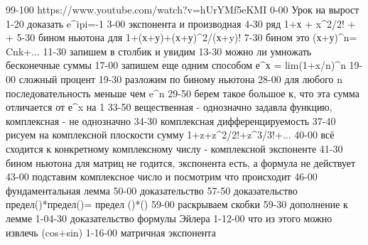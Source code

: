 99-100
https://www.youtube.com/watch?v=hUrYMf5eKMI
0-00 Урок на вырост
1-20 доказать e^ipi=-1
3-00 экспонента и производная
4-30 ряд 1+х + x^2/2! + +
5-30 бином ньютона для 1+(х+у)+(х+у)^2/(х+y)!
7-30 бином это (х+у)^n= Cnk+...
11-30 запишем в столбик и увидим
13-30 можно ли умножать бесконечные суммы
17-00 запишем еще одним способом е^х = lim(1+x/n)^n
19-00 сложный процент
19-30 разложим по биному ньютона
28-00 для любого n последовательность меньше чем e^n
29-50 берем такое большое к, что эта сумма отличается от е^x на 1%
33-50 вещественная - однозначно задавла функцию, комплексная - не однозначно
34-30 комплексная дифференцируемость
37-40 рисуем на комплексной плоскости сумму 1+z+z^2/2!+z^3/3!+...
40-00 всё сходится к конкретному комплексному числу - комплексной экспоненте
41-30 бином ньютона для матриц не годится, экспонента есть, а формула не действует
43-00 подставим комплексное число и посмотрим что происходит
46-00 фундаментальная лемма
50-00 доказательство
57-50 доказательство предел()*предел()= предел ()*()
59-00 раскрываем скобки
59-30 дополнение к лемме
1-04-30 доказательство формулы Эйлера
1-12-00 что из этого можно извлечь (cos+sin)
1-16-00 матричная экспонента




















